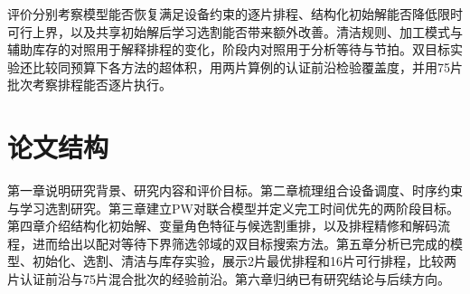 评价分别考察模型能否恢复满足设备约束的逐片排程、结构化初始解能否降低限时可行上界，以及共享初始解后学习选割能否带来额外改善。清洁规则、加工模式与辅助库存的对照用于解释排程的变化，阶段内对照用于分析等待与节拍。双目标实验还比较同预算下各方法的超体积，用两片算例的认证前沿检验覆盖度，并用75片批次考察排程能否逐片执行。
\section{论文结构}
第一章说明研究背景、研究内容和评价目标。第二章梳理组合设备调度、时序约束与学习选割研究。第三章建立PW对联合模型并定义完工时间优先的两阶段目标。第四章介绍结构化初始解、变量角色特征与候选割重排，以及排程精修和解码流程，进而给出以配对等待下界筛选邻域的双目标搜索方法。第五章分析已完成的模型、初始化、选割、清洁与库存实验，展示2片最优排程和16片可行排程，比较两片认证前沿与75片混合批次的经验前沿。第六章归纳已有研究结论与后续方向。
